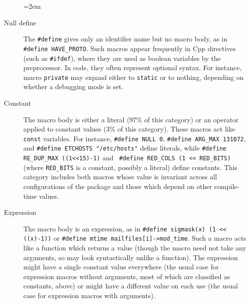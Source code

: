 

\begin{description}
  \sloppy
  \emergencystretch=2em

\item[Null define]  The {\tt \#define} gives only an
  identifier name but no macro body, as in {\tt \#define
  \verb|HAVE_PROTO|}\@.  Such macros appear frequently in Cpp
directives (such as {\tt \#ifdef}), where they are used as boolean
variables by the preprocessor.  In code, they often represent optional
syntax.  For instance,
macro {\tt private} may expand either to {\tt static} or to nothing,
depending on whether a debugging mode is set.

\item[Constant] The macro body is either a literal (97\% of this category)
  or an operator applied to constant values (3\% of this category).
  These macros act like {\tt const} variables. 
  For instance, {\tt \#define NULL 0}, {\tt \#define \verb|ARG_MAX|
  131072}, and {\tt \#define ETCHOSTS "/etc/hosts"} define literals, while
{\tt \#define \verb|RE_DUP_MAX| ((1<<15)-1)} and {\tt
\#define \verb|RED_COLS| (1 << \verb|RED_BITS|)} (where \verb|RED_BITS| is
a constant, possibly a literal) define constants.  This category includes
both macros whose value is invariant across all configurations of the
package and those which depend on other compile-time values.  

\item[Expression]  The macro body is an expression, as in {\tt \#define
  sigmask(x) (1 << ((x)-1))} or {\tt \#define mtime mailfiles[i]->\verb|mod_time|}.
Such a macro acts like a function which returns a value (though the
macro need not take any arguments, so may look syntactically unlike a function).
The expression might have a single constant value everywhere (the usual
case for expression macros without arguments, most of which are classified
as constants, above) or might have a different value on each use (the usual
case for expression macros with arguments).


\end{description}
